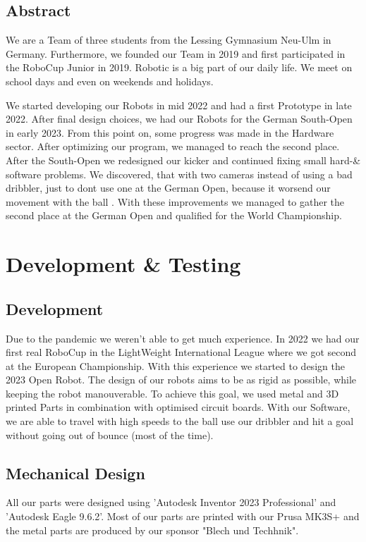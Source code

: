 \documentclass{scrartcl}
\begin{document}
\subsection{Abstract}
We are a Team of three students from the Lessing Gymnasium Neu-Ulm in Germany. Furthermore, we founded our Team
in 2019 and first participated in the RoboCup Junior in 2019. Robotic is a big part of our daily life.
We meet on school days and even on weekends and holidays.


We started developing our Robots in mid 2022 and had a first Prototype in late 2022. After final design
choices, we had our Robots for the German South-Open in early 2023. From this point on, some progress was
made in the Hardware sector.
After optimizing our program, we managed to reach the second place.
\newline
After the South-Open we redesigned our kicker and continued fixing small hard-\& software problems. We discovered, that with two cameras
instead of using a bad dribbler, just to dont use one at the German Open, because it worsend our movement with the ball .
With these improvements we managed to gather the second place at the German Open and qualified for the World Championship.

\section{Development \& Testing}

\subsection{Development}
Due to the pandemic we weren't able to get much experience. In 2022 we had our first real RoboCup
in the LightWeight International League where we got second at the European Championship. With this experience we started to design the 2023 Open Robot.
\newline
The design of our robots aims to be as rigid as possible, while keeping the robot manouverable.
To achieve this goal, we used metal and 3D printed Parts in combination with optimised circuit boards.
With our Software, we are able to travel with high speeds to the ball use our dribbler and
hit a goal without going out of bounce (most of the time).


\subsection{Mechanical Design}
All our parts were designed using 'Autodesk Inventor 2023 Professional' and 'Autodesk Eagle 9.6.2'.
Most of our parts are printed with our Prusa MK3S+ and the metal parts are produced
by our sponsor "Blech und Techhnik".
\end{document}
